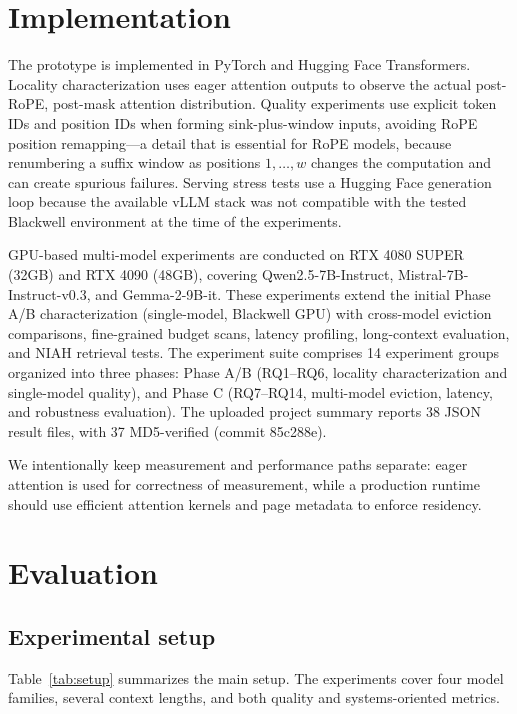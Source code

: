 \documentclass[11pt]{article}
\theoremstyle{definition}
\theoremstyle{plain}
\begin{document}
\section{Implementation}
\label{sec:implementation}

The prototype is implemented in PyTorch and Hugging Face Transformers.  Locality characterization uses eager attention outputs to observe the actual post-RoPE, post-mask attention distribution.  Quality experiments use explicit token IDs and position IDs when forming sink-plus-window inputs, avoiding RoPE position remapping---a detail that is essential for RoPE models, because renumbering a suffix window as positions $1,\ldots,w$ changes the computation and can create spurious failures.  Serving stress tests use a Hugging Face generation loop because the available vLLM stack was not compatible with the tested Blackwell environment at the time of the experiments.

GPU-based multi-model experiments are conducted on RTX 4080 SUPER (32GB) and RTX 4090 (48GB), covering Qwen2.5-7B-Instruct, Mistral-7B-Instruct-v0.3, and Gemma-2-9B-it.  These experiments extend the initial Phase A/B characterization (single-model, Blackwell GPU) with cross-model eviction comparisons, fine-grained budget scans, latency profiling, long-context evaluation, and NIAH retrieval tests.  The experiment suite comprises 14 experiment groups organized into three phases: Phase A/B (RQ1--RQ6, locality characterization and single-model quality), and Phase C (RQ7--RQ14, multi-model eviction, latency, and robustness evaluation).  The uploaded project summary reports 38 JSON result files, with 37 MD5-verified (commit 85c288e).

We intentionally keep measurement and performance paths separate: eager attention is used for correctness of measurement, while a production runtime should use efficient attention kernels and page metadata to enforce residency.

\section{Evaluation}
\label{sec:evaluation}

\subsection{Experimental setup}
Table~\ref{tab:setup} summarizes the main setup.  The experiments cover four model families, several context lengths, and both quality and systems-oriented metrics.
\end{document}
